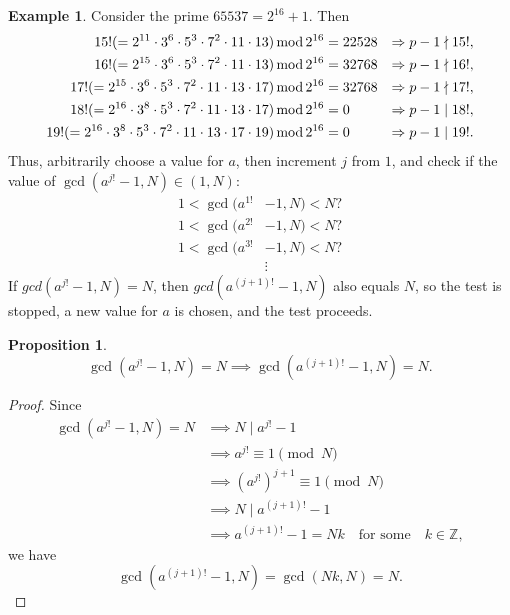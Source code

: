 \documentclass[12pt,openany]{book}
\newtheorem{proposition}[theorem]{Proposition}
\theoremstyle{definition}
\newtheorem{example}{Example}[chapter]
\newcommand{\Z}{\mathbb{Z}}
\newcommand{\of}[1]{\left( #1 \right)}
\renewcommand{\mod}{\operatorname{\textnormal{mod}}}
\begin{document}
	\begin{example}
		Consider the prime $65537=2^{16}+1$. Then \begin{align*}
			15!(=2^{11}\cdot 3^6\cdot 5^3\cdot 7^2\cdot 11\cdot 13)\mod 2^{16} &= 22528&\Rightarrow p-1\nmid 15!,\\
			16!(=2^{15}\cdot 3^6\cdot 5^3\cdot 7^2\cdot 11\cdot 13)\mod 2^{16} &= 32768&\Rightarrow p-1\nmid 16!,\\
			17!(=2^{15}\cdot 3^6\cdot 5^3\cdot 7^2\cdot 11\cdot 13\cdot 17)\mod 2^{16} &= 32768&\Rightarrow p-1\nmid 17!,\\
			18!(=2^{16}\cdot 3^8\cdot 5^3\cdot 7^2\cdot 11\cdot 13\cdot 17)\mod 2^{16} &= 0&\Rightarrow p-1\mid 18!,\\
			19!(=2^{16}\cdot 3^8\cdot 5^3\cdot 7^2\cdot 11\cdot 13\cdot 17\cdot 19)\mod 2^{16} &= 0&\Rightarrow p-1\mid 19!.
		\end{align*} Thus, arbitrarily choose a value for $a$, then increment $j$ from $1$, and check if the value of $\gcd\of{a^{j!}-1,N}\in(1,N)$:
		\begin{align*}
			1<\gcd(a^{1!}&-1,N)<N?\\
			1<\gcd(a^{2!}&-1,N)<N?\\
			1<\gcd(a^{3!}&-1,N)<N?\\
			&\vdots
		\end{align*}
		If $gcd(a^{j!} - 1, N) = N$, then $gcd(a^{(j+1)!} - 1, N)$ also equals $N$, so the test is stopped, a new value for $a$ is chosen, and the test proceeds.
	\end{example}
	\vspace{8pt}
	\begin{tcolorbox}[colback=white,colframe=procolor,arc=5pt,title={\color{white}\bf Existence of the Multiple of $p-1$}]
		\begin{proposition}
			\[
			\gcd\of{a^{j!}-1,N}=N\implies\gcd\of{a^{\of{j+1}!}-1,N}=N.
			\]
		\end{proposition}
	\end{tcolorbox}
	\begin{proof}
		Since \begin{align*}
			\gcd\of{a^{j!}-1,N}=N&\implies N\mid a^{j!}-1\\
			&\implies a^{j!}\equiv 1\pmod{N}\\
			&\implies \of{a^{j!}}^{j+1}\equiv 1\pmod{N}\\
			&\implies N\mid a^{\of{j+1}!}-1\\
			&\implies a^{\of{j+1}!}-1=Nk\quad \text{for some}\quad k\in\Z,
		\end{align*} we have \[
		\gcd\of{a^{\of{j+1}!}-1,N}=\gcd\of{Nk,N}=N.
		\]
	\end{proof}
	
\end{document}
